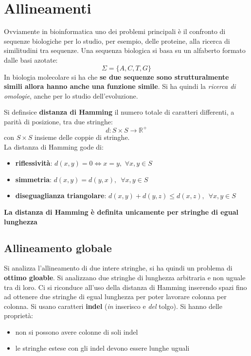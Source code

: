 \documentclass[a4paper,12pt, oneside]{book}
\begin{document}
\chapter{Allineamenti}
Ovviamente in bioinformatica uno dei problemi principali è il
confronto di sequenze biologiche per lo studio, per esempio, delle
proteine, alla ricerca di similitudini tra sequenze. Una sequenza
biologica si basa su un alfaberto formato dalle basi azotate:
\[\Sigma=\{A,C,T,G\}\]
In biologia molecolare si ha che \textbf{se due sequenze sono
  strutturalmente simili allora hanno anche una funzione simile}.
Si ha quindi la \textit{ricerca di omologie}, anche per lo studio
dell'evoluzione.
\begin{definizione}
  Si definsice \textbf{distanza di Hamming} il numero totale di
  caratteri differenti, a parità di posizione, tra due stringhe:
  \[d:S\times S\to\mathbb{R}^+\]
  con $S\times S$ insieme delle coppie di stringhe.\\
  La distanza di Hamming gode di:
  \begin{itemize}
    \item \textbf{riflessività}: $d(x,y)=0\Longleftrightarrow x=y,\,\,\forall
    x,y\in S$
    \item \textbf{simmetria}: $d(x,y)=d(y,x),\,\,\,\forall
    x,y\in S$
    \item \textbf{diseguaglianza triangolare}: $d(x,y)+d(y,z)\leq
    d(x,z),\,\,\,\forall x,y\in S$
  \end{itemize}
  \textbf{La distanza di Hamming è definita unicamente per stringhe di
  egual lunghezza}
\end{definizione}
\newpage

\section{Allineamento globale}
Si analizza l'allineamento di due intere stringhe, si ha quindi un
problema di \textbf{ottimo gloable}. Si analizzano due stringhe di
lunghezza arbitraria e non uguale tra di loro. Ci si riconduce all'uso
della distanza di Hamming inserendo spazi fino ad ottenere due
stringhe di egual lunghezza per poter lavorare colonna per colonna.
Si usano caratteri \textbf{indel} (\textit{in} inserisco e
\textit{del} tolgo). Si hanno delle proprietà:
\begin{itemize}
  \item non si possono avere colonne di soli indel
  \item le stringhe estese con gli indel devono essere lunghe uguali
\end{itemize}
\end{document}
